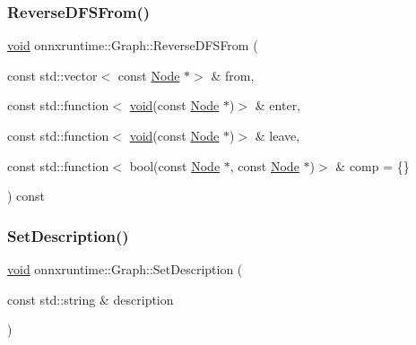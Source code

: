 \mbox{\label{classonnxruntime_1_1Graph_ab9ff5067db6b6dade2962c9e77cf6591}} 
\subsubsection{\texorpdfstring{Reverse\+D\+F\+S\+From()}{ReverseDFSFrom()}\hspace{0.1cm}{\footnotesize\ttfamily [2/2]}}
{\footnotesize\ttfamily \mbox{\hyperlink{mlasi_8h_a88f941d423cb2a819b70a1358982b1a6}{void}} onnxruntime\+::\+Graph\+::\+Reverse\+D\+F\+S\+From (\begin{DoxyParamCaption}\item[{const std\+::vector$<$ const \mbox{\hyperlink{classonnxruntime_1_1Node}{Node}} $\ast$$>$ \&}]{from,  }\item[{const std\+::function$<$ \mbox{\hyperlink{mlasi_8h_a88f941d423cb2a819b70a1358982b1a6}{void}}(const \mbox{\hyperlink{classonnxruntime_1_1Node}{Node}} $\ast$)$>$ \&}]{enter,  }\item[{const std\+::function$<$ \mbox{\hyperlink{mlasi_8h_a88f941d423cb2a819b70a1358982b1a6}{void}}(const \mbox{\hyperlink{classonnxruntime_1_1Node}{Node}} $\ast$)$>$ \&}]{leave,  }\item[{const std\+::function$<$ bool(const \mbox{\hyperlink{classonnxruntime_1_1Node}{Node}} $\ast$, const \mbox{\hyperlink{classonnxruntime_1_1Node}{Node}} $\ast$)$>$ \&}]{comp = {\ttfamily \{\}} }\end{DoxyParamCaption}) const}

\mbox{\label{classonnxruntime_1_1Graph_abf45d42d7f95a9147c7830d9c2cd25ae}} 
\subsubsection{\texorpdfstring{Set\+Description()}{SetDescription()}}
{\footnotesize\ttfamily \mbox{\hyperlink{mlasi_8h_a88f941d423cb2a819b70a1358982b1a6}{void}} onnxruntime\+::\+Graph\+::\+Set\+Description (\begin{DoxyParamCaption}\item[{const std\+::string \&}]{description }\end{DoxyParamCaption})\hspace{0.3cm}{\ttfamily [virtual]}}

